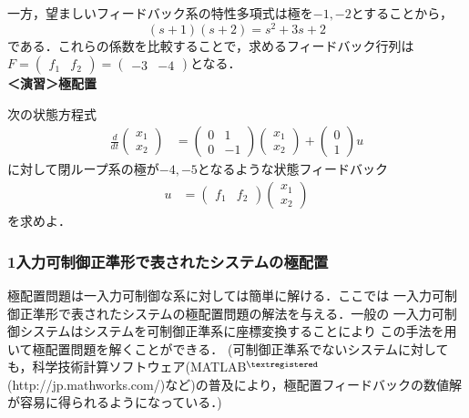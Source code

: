 一方，望ましいフィードバック系の特性多項式は極を$-1, -2$とすることから，
\begin{equation}
 (s + 1)(s + 2) = s^2 + 3 s + 2
\end{equation}
である．これらの係数を比較することで，求めるフィードバック行列は
$F = (\begin{array}{cc}f_1 & f_2\end{array}) = 
(\begin{array}{cc}-3 & -4\end{array})$となる．
\\

\noindent
{\bf ＜演習＞極配置} \nopagebreak

次の状態方程式
\begin{align*}
	\frac{d}{dt}
	\left (
	\begin{array}{c}
	 x_1 \\ x_2 
	\end{array}
	\right )
	& = 
	\left (
	\begin{array}{cc}
	 0 & 1 \\
	 0 & -1
	\end{array}
	\right )
	\left (
	\begin{array}{c}
	 x_1 \\ x_2 
	\end{array}
	\right )
	+
	\left (
	\begin{array}{c}
	 0 \\ 1 
	\end{array}
	\right )
	u
\end{align*}
に対して閉ループ系の極が$-4,-5$となるような状態フィードバック
\begin{align*}
	u 
	&=
	\left (
	\begin{array}{cc}
	 f_1 & f_2
	\end{array}
	\right )
	\left (
	\begin{array}{c}
	 x_1 \\ x_2 
	\end{array}
	\right )
\end{align*}
を求めよ．


\subsubsection{1入力可制御正準形で表されたシステムの極配置}

極配置問題は一入力可制御な系に対しては簡単に解ける．ここでは
一入力可制御正準形で表されたシステムの極配置問題の解法を与える．一般の
一入力可制御システムはシステムを可制御正準系に座標変換することにより
この手法を用いて極配置問題を解くことができる．
(可制御正準系でないシステムに対しても，科学技術計算ソフトウェア(MATLAB$^{\tiny \textregistered}$ (http://jp.mathworks.com/)など)の普及により，極配置フィードバックの数値解が容易に得られるようになっている．)


